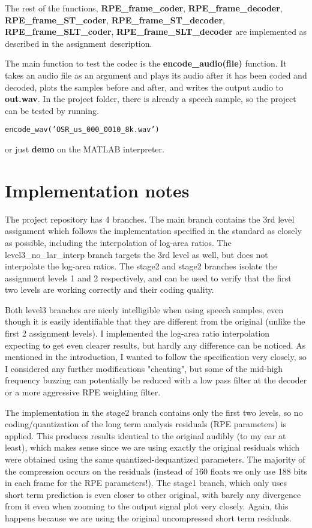 \documentclass[]{article}
\begin{document}
The rest of the functions, \textbf{RPE\_frame\_coder}, \textbf{RPE\_frame\_decoder}, \\ \textbf{RPE\_frame\_ST\_coder}, \textbf{RPE\_frame\_ST\_decoder}, \textbf{RPE\_frame\_SLT\_coder}, \textbf{RPE\_frame\_SLT\_decoder} are implemented as described in the assignment description.

The main function to test the codec is the \textbf{encode\_audio(file)} function. It takes an audio file as an argument and plays its audio after it has been coded and decoded, plots the samples before and after, and writes the output audio to \textbf{out.wav}. In the project folder, there is already a speech sample, so the project can be tested by running.

\begin{center}
	\texttt{encode\_wav('OSR\_us\_000\_0010\_8k.wav')}
\end{center}

\noindent or just \textbf{demo} on the MATLAB interpreter.

\section{Implementation notes}
The project repository has 4 branches. The main branch contains the 3rd level assignment which follows the implementation specified in the standard as closely as possible, including the interpolation of log-area ratios. The level3\_no\_lar\_interp branch targets the 3rd level as well, but does not interpolate the log-area ratios. The stage2 and stage2 branches isolate the assignment levels 1 and 2 respectively, and can be used to verify that the first two levels are working correctly and their coding quality.

Both level3 branches are nicely intelligible when using speech samples, even though it is easily identifiable that they are different from the original (unlike the first 2 assignment levels). I implemented the log-area ratio interpolation expecting to get even clearer results, but hardly any difference can be noticed. As mentioned in the introduction, I wanted to follow the specification very closely, so I considered any further modifications "cheating", but some of the mid-high frequency buzzing can potentially be reduced with a low pass filter at the decoder or a more aggressive RPE weighting filter.

The implementation in the stage2 branch contains only the first two levels, so no coding/quantization of the long term analysis residuals (RPE parameters) is applied. This produces results identical to the original audibly (to my ear at least), which makes sense since we are using exactly the original residuals which were obtained using the same quantized-dequantized parameters. The majority of the compression occurs on the residuals (instead of 160 floats we only use 188 bits in each frame for the RPE parameters!). The stage1 branch, which only uses short term prediction is even closer to other original, with barely any divergence from it even when zooming to the output signal plot very closely. Again, this happens because we are using the original uncompressed short term residuals.
\end{document}
